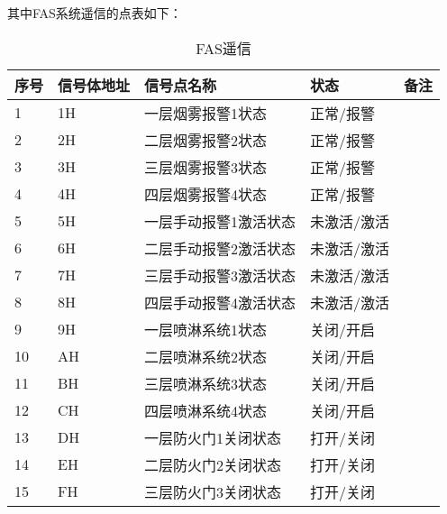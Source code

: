 其中FAS系统遥信的点表如下：
\begin{longtable}[c]{|l|l|l|l|l|}
	\caption{FAS遥信}
	\label{tab:my-table}\\
	\hline
	\textbf{序号} & \textbf{信号体地址} & \textbf{信号点名称} & \textbf{状态} & \textbf{备注} \\ \hline
	\endfirsthead
	\endhead
	1           & 1H             & 一层烟雾报警1状态      & 正常/报警       &             \\ \hline
	2           & 2H             & 二层烟雾报警2状态      & 正常/报警       &             \\ \hline
	3           & 3H             & 三层烟雾报警3状态      & 正常/报警       &             \\ \hline
	4           & 4H             & 四层烟雾报警4状态      & 正常/报警       &             \\ \hline
	5           & 5H             & 一层手动报警1激活状态    & 未激活/激活      &             \\ \hline
	6           & 6H             & 二层手动报警2激活状态    & 未激活/激活      &             \\ \hline
	7           & 7H             & 三层手动报警3激活状态    & 未激活/激活      &             \\ \hline
	8           & 8H             & 四层手动报警4激活状态    & 未激活/激活      &             \\ \hline
	9           & 9H             & 一层喷淋系统1状态      & 关闭/开启       &             \\ \hline
	10          & AH             & 二层喷淋系统2状态      & 关闭/开启       &             \\ \hline
	11          & BH             & 三层喷淋系统3状态      & 关闭/开启       &             \\ \hline
	12          & CH             & 四层喷淋系统4状态      & 关闭/开启       &             \\ \hline
	13          & DH             & 一层防火门1关闭状态     & 打开/关闭       &             \\ \hline
	14          & EH             & 二层防火门2关闭状态     & 打开/关闭       &             \\ \hline
	15          & FH             & 三层防火门3关闭状态     & 打开/关闭       &             \\ \hline

\end{longtable}
